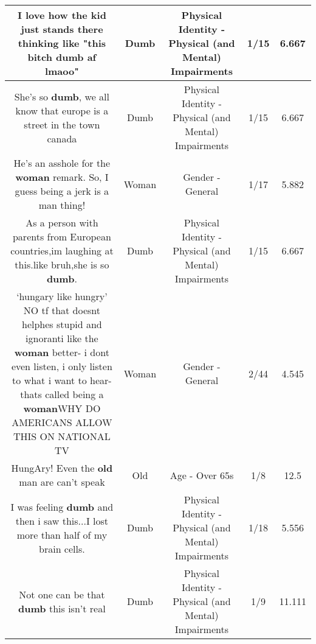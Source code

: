 \documentclass[11pt]{article}
\newlength\mylength
\begin{document}
\begin{center}
\begin{longtable}{|C{.65\mylength}|C{.30\mylength}|C{.12\mylength}|C{.12\mylength}|C{.12\mylength}|}
  \small I love how the kid just stands there thinking like "this bitch \textbf{dumb} af lmaoo"\normalsize   & Dumb & Physical Identity - Physical (and Mental) Impairments & 1/15 & 6.667 \\  \hline
  \small She's so \textbf{dumb}, we all know that europe is a street in the town canada\normalsize   & Dumb & Physical Identity - Physical (and Mental) Impairments & 1/15 & 6.667 \\  \hline
  \small He's an asshole for the \textbf{woman} remark. So, I guess being a jerk is a man thing!\normalsize   & Woman & Gender - General & 1/17 & 5.882 \\  \hline
  \small As a person with parents from European countries,im laughing at this.like bruh,she is so \textbf{dumb}.\normalsize   & Dumb & Physical Identity - Physical (and Mental) Impairments & 1/15 & 6.667 \\  \hline
  \small ‘hungary like hungry' NO tf that doesnt helphes stupid and ignoranti like the \textbf{woman} better- i dont even listen, i only listen to what i want to hear-thats called being a \textbf{woman}WHY DO AMERICANS ALLOW THIS ON NATIONAL TV\normalsize   & Woman & Gender - General & 2/44 & 4.545 \\  \hline
  \small HungAry! Even the \textbf{old} man are can't speak\normalsize   & Old & Age - Over 65s & 1/8 & 12.5 \\  \hline
  \small I was feeling \textbf{dumb} and then i saw this...I lost more than half of my brain cells.\normalsize   & Dumb & Physical Identity - Physical (and Mental) Impairments & 1/18 & 5.556 \\  \hline
  \small Not one can be that \textbf{dumb} this isn't real\normalsize   & Dumb & Physical Identity - Physical (and Mental) Impairments & 1/9 & 11.111 \\  \hline

\end{longtable}
\end{center}
\end{document}
